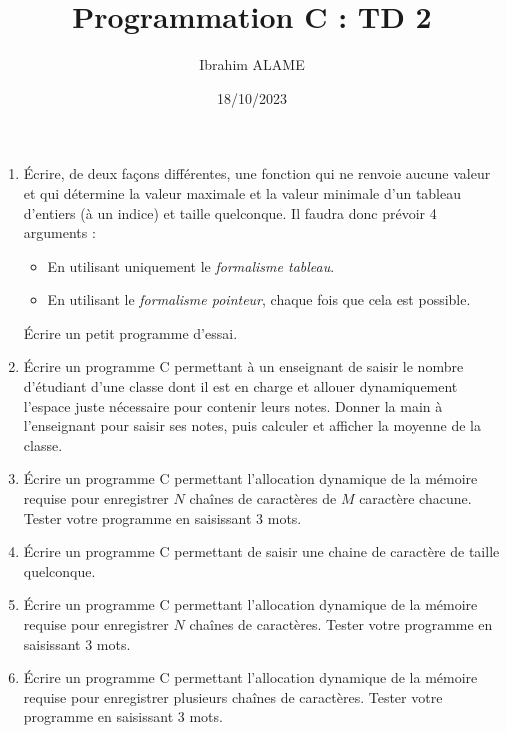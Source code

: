 \documentclass[a4paper]{article}
\title{Programmation C : TD 2}
\author{Ibrahim ALAME}
\date{18/10/2023}
\begin{document}
\maketitle

\begin{enumerate}
\item Écrire, de deux façons différentes, une fonction qui ne renvoie aucune valeur et qui détermine
 la valeur maximale et la valeur minimale d'un tableau d'entiers (à un indice) et taille quelconque. 
 Il faudra donc prévoir 4 arguments :
 \begin{itemize}
 \item En utilisant uniquement le {\em formalisme tableau}.
 \item En utilisant  le {\em formalisme pointeur}, chaque fois que cela est possible.
 \end{itemize}
Écrire un petit programme d'essai.

\item Écrire un programme C permettant à un enseignant de saisir le nombre d'étudiant d'une classe dont il est en charge et allouer dynamiquement l'espace juste nécessaire pour contenir leurs notes. Donner la main à l'enseignant pour saisir ses notes, puis calculer et afficher la moyenne de la classe.
 
 \item  Écrire un programme C permettant l'allocation dynamique de la mémoire requise pour enregistrer $N$ chaînes de caractères de $M$ caractère chacune. Tester votre programme en saisissant 3 mots.
\item Écrire un programme C permettant de saisir une chaine de caractère de taille quelconque.
 \item  Écrire un programme C permettant l'allocation dynamique de la mémoire requise pour enregistrer $N$ chaînes de caractères. Tester votre programme en saisissant 3 mots.
 \item  Écrire un programme C permettant l'allocation dynamique de la mémoire requise pour enregistrer plusieurs chaînes de caractères.  Tester votre programme en saisissant 3 mots.
\end{enumerate}
\end{document}
